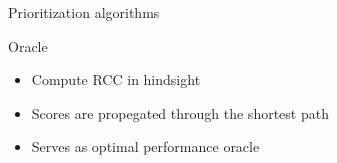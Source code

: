 \begin{frame}[t]{Prioritization algorithms}
  \begin{block}{Oracle}
        \begin{itemize}
        \item Compute RCC in hindsight
        \item Scores are propegated through the shortest path
        \item Serves as optimal performance oracle
    \end{itemize}
  \end{block}
\end{frame}

